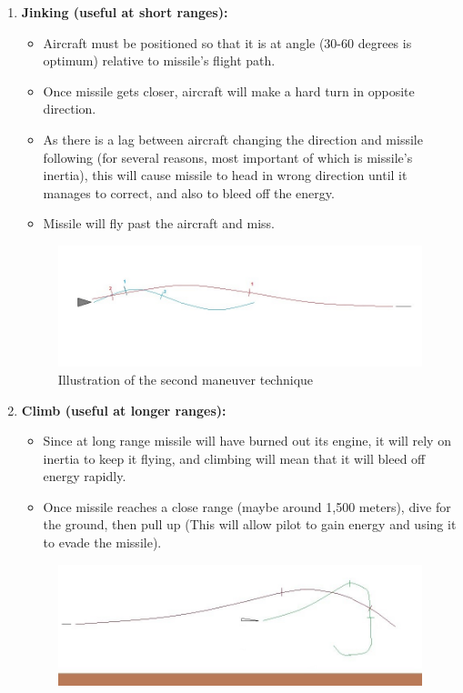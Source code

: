 \begin{enumerate}
	\item \textbf{ Jinking (useful at short ranges):}
	\begin{itemize}
		\item Aircraft must be positioned so that it is at angle (30-60 degrees is optimum) relative to missile’s flight path.
		\item Once missile gets closer, aircraft will make a hard turn in opposite direction.
		\item As there is a lag between aircraft changing the direction and missile following (for several reasons, most important of which is missile’s inertia), this will cause missile to head in wrong direction until it manages to correct, and also to bleed off the energy.
		\item Missile will fly past the aircraft and miss.
	\end{itemize}
					\begin{figure}[H]
						 \centering
						 \includegraphics[scale = 0.7]{fig/evasiontech2.jpg}
						 \caption{Illustration of the second maneuver technique}
					\end{figure}
	\item  \textbf{Climb (useful at longer ranges):}
	\begin{itemize}
		\item Since at long range missile will have burned out its engine, it will rely on inertia to keep it flying, and climbing will mean that it will bleed off energy rapidly.
		\item Once missile reaches a close range (maybe around 1,500 meters), dive for the ground, then pull up (This will allow pilot to gain energy and using it to evade the missile).
	\end{itemize}
			\begin{figure}[H]
				\centering
				\includegraphics[scale = 0.7]{fig/evasiontech3.jpg}

\end{figure}
\end{enumerate}
